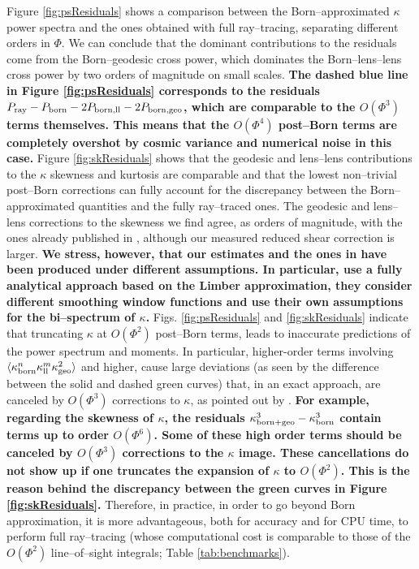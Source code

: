 \documentclass[reprint,aps,prd,superscriptaddress,showkeys,showpacs]{revtex4-1}
\begin{document}
Figure \ref{fig:psResiduals} shows a comparison between the Born--approximated $\kappa$ power spectra and the ones obtained with full ray--tracing, separating different orders in $\Phi$. We can conclude that the dominant contributions to the residuals come from the Born--geodesic cross power, which dominates the Born--lens--lens cross power by two orders of magnitude on small scales. \textbf{\color{ForestGreen} The dashed blue line in Figure \ref{fig:psResiduals} corresponds to the residuals $P_{\rm ray} - P_{\rm born} - 2P_{\rm born,ll} - 2P_{\rm born,geo}$, which are comparable to the $O(\Phi^3)$ terms themselves. This means that the $O(\Phi^4)$ post--Born terms are completely overshot by cosmic variance and numerical noise in this case.} Figure \ref{fig:skResiduals} shows that the geodesic and lens--lens contributions to the $\kappa$ skewness and kurtosis are comparable and that the lowest non--trivial post--Born corrections can fully account for the discrepancy between the Born--approximated quantities and the fully ray--traced ones. The geodesic and lens--lens corrections to the skewness we find agree, as orders of magnitude, with the ones already published in \citep{WLBispectrumDodelson}, although our measured reduced shear correction is larger. \textbf{\color{red} We stress, however, that our estimates and the ones in \citep{WLBispectrumDodelson} have been produced under different assumptions. In particular, \citep{WLBispectrumDodelson} use a fully analytical approach based on the Limber approximation, they consider different smoothing window functions and use their own assumptions for the bi--spectrum of $\kappa$.} Figs. \ref{fig:psResiduals} and \ref{fig:skResiduals} indicate that truncating $\kappa$ at $O(\Phi^2)$ post--Born terms, leads to inaccurate predictions of the power spectrum and moments. In particular, higher-order terms involving $\langle \kappa_{\rm born}^n \kappa_{\rm ll}^m \kappa_{\rm geo}^2\rangle$ and higher, cause large deviations (as seen by the difference between the solid and dashed green curves) that, in an exact approach, are canceled by $O(\Phi^3)$ corrections to $\kappa$, as pointed out by \citep{HirataKrause,CMBPrattenLewis,ScoccimarroLoop}. \textbf{\color{blue} For example, regarding the skewness of $\kappa$, the residuals $\kappa^3_{\rm born+geo}-\kappa^3_{\rm born}$ contain terms up to order $O(\Phi^6)$. Some of these high order terms should be canceled by $O(\Phi^3)$ corrections to the $\kappa$ image. These cancellations do not show up if one truncates the expansion of $\kappa$ to $O(\Phi^2)$. This is the reason behind the discrepancy between the green curves in Figure \ref{fig:skResiduals}.} Therefore, in practice, in order to go beyond Born approximation, it is more advantageous, both for accuracy and for CPU time, to perform full ray--tracing (whose computational cost is comparable to those of the $O(\Phi^2)$ line--of--sight integrals; Table \ref{tab:benchmarks}).
\end{document}

